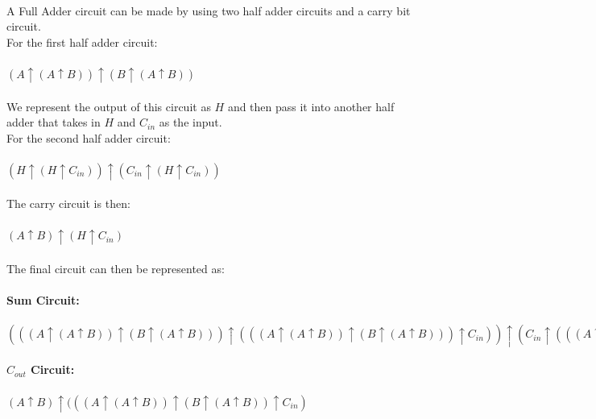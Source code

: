 \documentclass{article}
\begin{document}
    \pagebreak
    \ \\
    A Full Adder circuit can be made by using two half adder circuits and a carry bit circuit.\\
    For the first half adder circuit:\\
    \\
    $(A \uparrow (A \uparrow B)) \uparrow (B \uparrow (A \uparrow B))$\\
    \\
    We represent the output of this circuit as $H$ and then pass it into another half adder that takes in $H$ and $C_{in}$ as the input.\\
    For the second half adder circuit:\\
    \\
    $(H \uparrow (H \uparrow C_{in})) \uparrow (C_{in} \uparrow (H \uparrow C_{in}))$\\
    \\
    The carry circuit is then:\\
    \\
    $(A \uparrow B) \uparrow (H \uparrow C_{in})$\\
    \\
    The final circuit can then be represented as:\\
    \\
    \textbf{Sum Circuit:}\\
    \\
    $(((A \uparrow (A \uparrow B)) \uparrow (B \uparrow (A \uparrow B))) \uparrow (((A \uparrow (A \uparrow B)) \uparrow (B \uparrow (A \uparrow B))) \uparrow C_{in})) \uparrow (C_{in} \uparrow (((A \uparrow (A \uparrow B)) \uparrow (B \uparrow (A \uparrow B))) \uparrow C_{in}))$\\
    \\
    \textbf{$C_{out}$ Circuit:}\\
    \\
    $(A \uparrow B) \uparrow (((A \uparrow (A \uparrow B)) \uparrow (B \uparrow (A \uparrow B)) \uparrow C_{in})$\\
    \\
    
\end{document}
